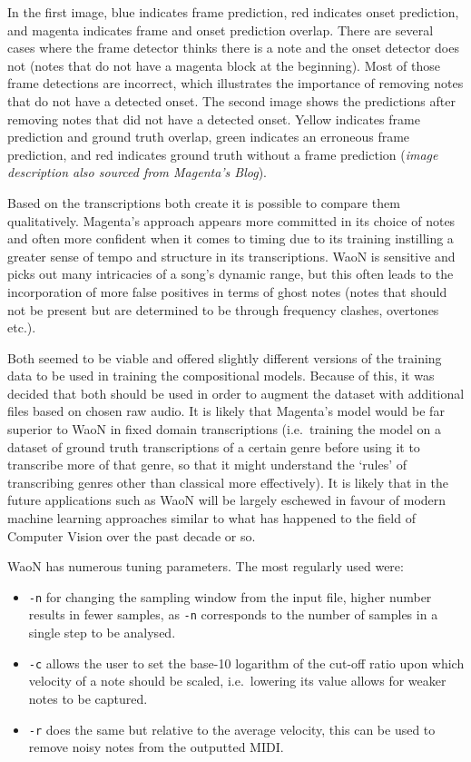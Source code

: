 \documentclass[12pt,]{article}
\providecommand{\tightlist}{%
  \setlength{\itemsep}{0pt}\setlength{\parskip}{0pt}}
\begin{document}
In the first image, blue indicates frame prediction, red indicates onset
prediction, and magenta indicates frame and onset prediction overlap.
There are several cases where the frame detector thinks there is a note
and the onset detector does not (notes that do not have a magenta block
at the beginning). Most of those frame detections are incorrect, which
illustrates the importance of removing notes that do not have a detected
onset. The second image shows the predictions after removing notes that
did not have a detected onset. Yellow indicates frame prediction and
ground truth overlap, green indicates an erroneous frame prediction, and
red indicates ground truth without a frame prediction
(\textit{image description also sourced from Magenta's Blog}).

Based on the transcriptions both create it is possible to compare them
qualitatively. Magenta's approach appears more committed in its choice
of notes and often more confident when it comes to timing due to its
training instilling a greater sense of tempo and structure in its
transcriptions. WaoN is sensitive and picks out many intricacies of a
song's dynamic range, but this often leads to the incorporation of more
false positives in terms of ghost notes (notes that should not be
present but are determined to be through frequency clashes, overtones
etc.).

Both seemed to be viable and offered slightly different versions of the
training data to be used in training the compositional models. Because
of this, it was decided that both should be used in order to augment the
dataset with additional files based on chosen raw audio. It is likely
that Magenta's model would be far superior to WaoN in fixed domain
transcriptions (i.e.~training the model on a dataset of ground truth
transcriptions of a certain genre before using it to transcribe more of
that genre, so that it might understand the `rules' of transcribing
genres other than classical more effectively). It is likely that in the
future applications such as WaoN will be largely eschewed in favour of
modern machine learning approaches similar to what has happened to the
field of Computer Vision over the past decade or so.

WaoN has numerous tuning parameters. The most regularly used were:

\begin{itemize}
\tightlist
\item
  \texttt{-n} for changing the sampling window from the input file,
  higher number results in fewer samples, as \texttt{-n} corresponds to
  the number of samples in a single step to be analysed.
\item
  \texttt{-c} allows the user to set the base-10 logarithm of the
  cut-off ratio upon which velocity of a note should be scaled,
  i.e.~lowering its value allows for weaker notes to be captured.
\item
  \texttt{-r} does the same but relative to the average velocity, this
  can be used to remove noisy notes from the outputted MIDI.
\end{itemize}
\end{document}

